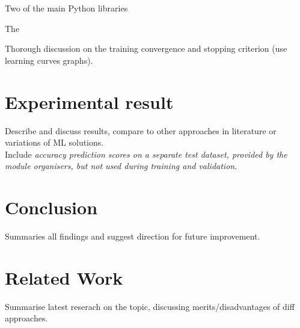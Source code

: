 \documentclass[conference]{IEEEtran}
\begin{document}
Two of the main Python libraries 

The 


Thorough discussion on the training convergence and stopping criterion (use learning curves graphs).\\

\section{Experimental result} \label{s-exp-res}

Describe and discuss results, compare to other approaches in literature or variations of ML solutions.\\

Include \textit{accuracy prediction scores on a separate test dataset, provided by the module organisers, but not used during training and validation}.\\

\section{Conclusion} \label{s-concl}

Summaries all findings and suggest direction for future improvement.\\

\section{Related Work} \label{s-rel-work}

Summarise latest reserach on the topic, discussing merits/disadvantages of diff approaches.\\




\end{document}
